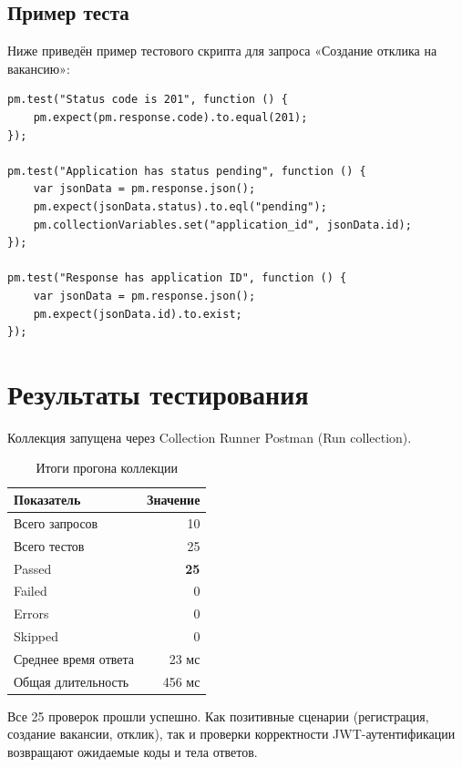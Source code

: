 ﻿\documentclass[a4paper,14pt]{extarticle}
\begin{document}
\subsection{Пример теста}

Ниже приведён пример тестового скрипта для запроса «Создание отклика на вакансию»:

\begin{lstlisting}[style=json, caption={Тест для POST /applications}]
pm.test("Status code is 201", function () {
    pm.expect(pm.response.code).to.equal(201);
});

pm.test("Application has status pending", function () {
    var jsonData = pm.response.json();
    pm.expect(jsonData.status).to.eql("pending");
    pm.collectionVariables.set("application_id", jsonData.id);
});

pm.test("Response has application ID", function () {
    var jsonData = pm.response.json();
    pm.expect(jsonData.id).to.exist;
});
\end{lstlisting}

\section{Результаты тестирования}

Коллекция запущена через Collection Runner Postman (Run collection).

\begin{table}[H]
\centering
\caption{Итоги прогона коллекции}
\begin{tabular}{lr}
\toprule
\textbf{Показатель} & \textbf{Значение} \\
\midrule
Всего запросов       & 10 \\
Всего тестов         & 25 \\
Passed               & \textbf{25} \\
Failed               & 0 \\
Errors               & 0 \\
Skipped              & 0 \\
Среднее время ответа & 23 мс \\
Общая длительность   & 456 мс \\
\bottomrule
\end{tabular}
\end{table}

Все 25 проверок прошли успешно. Как позитивные сценарии (регистрация, создание вакансии, отклик), так и проверки корректности JWT-аутентификации возвращают ожидаемые коды и тела ответов.
\end{document}
